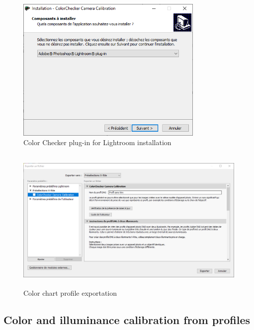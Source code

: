 \documentclass[
]{book}
\theoremstyle{definition}
\theoremstyle{definition}
\theoremstyle{definition}
\theoremstyle{definition}
\theoremstyle{remark}
\begin{document}
\begin{figure}
\hypertarget{color_checker_plug_in_win}{%
\centering
\includegraphics[width=\textwidth,height=7cm]{Figures/color_checker_plug_in_win.png}
\caption{Color Checker plug-in for Lightroom
installation}\label{color_checker_plug_in_win}
}
\end{figure}

\begin{figure}
\hypertarget{x_rite_preselection}{%
\centering
\includegraphics[width=\textwidth,height=7cm]{Figures/x_rite_preselection.png}
\caption{Color chart profile
exportation}\label{x_rite_preselection}
}
\end{figure}

\hypertarget{color-and-illuminance-calibration-from-profiles}{%
\subsection{Color and illuminance calibration from profiles}\label{color-and-illuminance-calibration-from-profiles}}
\end{document}
